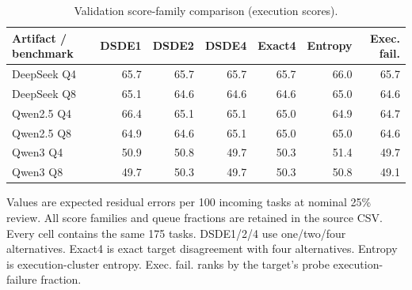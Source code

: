 \begin{table}[htbp]
\centering
\caption{Validation score-family comparison (execution scores).}
\label{tab:scores-validation-1}
\footnotesize
\begin{tabular}{lrrrrrr}
\toprule
Artifact / benchmark & DSDE1 & DSDE2 & DSDE4 & Exact4 & Entropy & Exec. fail. \\
\midrule
DeepSeek Q4 & 65.7 & 65.7 & 65.7 & 65.7 & 66.0 & 65.7 \\
DeepSeek Q8 & 65.1 & 64.6 & 64.6 & 64.6 & 65.0 & 64.6 \\
Qwen2.5 Q4 & 66.4 & 65.1 & 65.1 & 65.0 & 64.9 & 64.7 \\
Qwen2.5 Q8 & 64.9 & 64.6 & 65.1 & 65.0 & 65.0 & 64.6 \\
Qwen3 Q4 & 50.9 & 50.8 & 49.7 & 50.3 & 51.4 & 49.7 \\
Qwen3 Q8 & 49.7 & 50.3 & 49.7 & 50.3 & 50.8 & 49.1 \\
\bottomrule
\end{tabular}
\par\vspace{4pt}\begin{minipage}{0.98\linewidth}\footnotesize Values are expected residual errors per 100 incoming tasks at nominal 25\% review. All score families and queue fractions are retained in the source CSV. Every cell contains the same 175 tasks. DSDE1/2/4 use one/two/four alternatives. Exact4 is exact target disagreement with four alternatives. Entropy is execution-cluster entropy. Exec. fail. ranks by the target's probe execution-failure fraction.\end{minipage}
\end{table}

